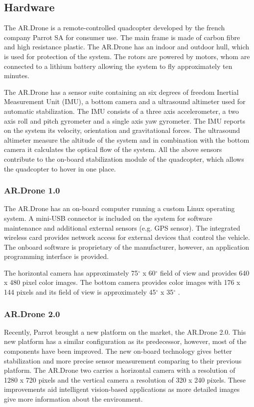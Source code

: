\documentclass[a4paper]{article}
\begin{document}
\begin{appendices}
\subsection{Hardware}
The AR.Drone is a remote-controlled quadcopter developed by the french company Parrot SA for consumer use. The main frame is made of carbon fibre and high resistance plastic. The AR.Drone has an indoor and outdoor hull, which is used for protection of the system. The rotors are powered by motors, whom are connected to a lithium battery allowing the system to fly approximately ten minutes.

The AR.Drone has a sensor suite containing an six degrees of freedom Inertial Measurement Unit (IMU), a bottom camera and a ultrasound altimeter used for automatic stabilization. The IMU consists of a three axis accelerometer, a two axis roll and pitch gyrometer and a single axis yaw gyrometer. The IMU reports on the system its velocity, orientation and gravitational forces. The ultrasound altimeter measure the altitude of the system and in combination with the bottom camera it calculates the optical flow of the system. All the above sensors contribute to the on-board stabilization module of the quadcopter, which allows the quadcopter to hover in one place.

\subsubsection{AR.Drone 1.0}
The AR.Drone has an on-board computer running a custom Linux operating system. A mini-USB connector is included on the system for software maintenance and additional external sensors (e.g. GPS sensor). The integrated wireless card provides network access for external devices that control the vehicle. The onboard software is proprietary of the manufacturer, however, an application programming interface is provided.

The horizontal camera has approximately 75$^{\circ}$ x 60$^{\circ}$ field of view and provides 640 x 480 pixel color images. The bottom camera provides color images with 176 x 144 pixels and its field of view is approximately 45$^{\circ}$ x 35$^{\circ}$ \cite{Krajnik2011}.

\subsubsection{AR.Drone 2.0}
Recently, Parrot brought a new platform on the market, the AR.Drone 2.0. This new platform has a similar configuration as its predecessor, however, most of the components have been improved. The new on-board technology gives better stabilization and more precise sensor measurement comparing to their previous platform. The AR.Drone two carries a horizontal camera with a resolution of 1280 x 720 pixels and the vertical camera a resolution of 320 x 240 pixels. These improvements aid intelligent vision-based applications as more detailed images give more information about the environment.


\end{appendices}
\end{document}
